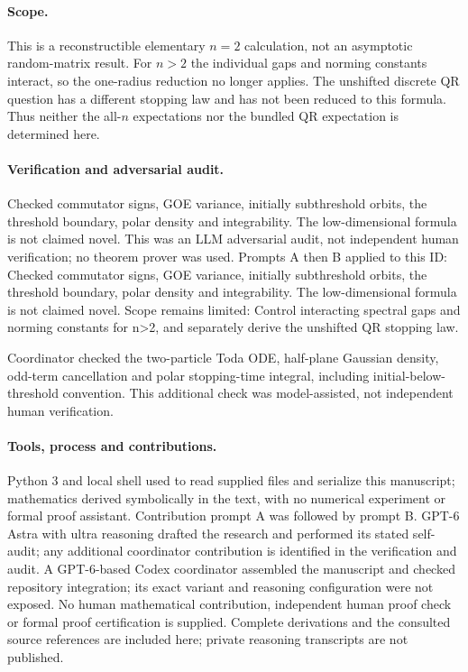 \documentclass[11pt]{article}
\begin{document}
\paragraph{Scope.}This is a reconstructible elementary \(n=2\) calculation, not an asymptotic random-matrix result. For \(n>2\) the individual gaps and norming constants interact, so the one-radius reduction no longer applies. The unshifted discrete QR question has a different stopping law and has not been reduced to this formula. Thus neither the all-\(n\) expectations nor the bundled QR expectation is determined here.

\paragraph{Verification and adversarial audit.}
Checked commutator signs, GOE variance, initially subthreshold orbits, the threshold boundary, polar density and integrability. The low-dimensional formula is not claimed novel. This was an LLM adversarial audit, not independent human verification; no theorem prover was used. Prompts A then B applied to this ID: Checked commutator signs, GOE variance, initially subthreshold orbits, the threshold boundary, polar density and integrability. The low-dimensional formula is not claimed novel. Scope remains limited: Control interacting spectral gaps and norming constants for n>2, and separately derive the unshifted QR stopping law.

Coordinator checked the two-particle Toda ODE, half-plane Gaussian density, odd-term cancellation and polar stopping-time integral, including initial-below-threshold convention. This additional check was model-assisted, not independent human verification.

\paragraph{Tools, process and contributions.}
Python 3 and local shell used to read supplied files and serialize this manuscript; mathematics derived symbolically in the text, with no numerical experiment or formal proof assistant. Contribution prompt A was followed by prompt B. GPT-6 Astra with ultra reasoning drafted the research and performed its stated self-audit; any additional coordinator contribution is identified in the verification and audit. A GPT-6-based Codex coordinator assembled the manuscript and checked repository integration; its exact variant and reasoning configuration were not exposed. No human mathematical contribution, independent human proof check or formal proof certification is supplied. Complete derivations and the consulted source references are included here; private reasoning transcripts are not published.
\end{document}
